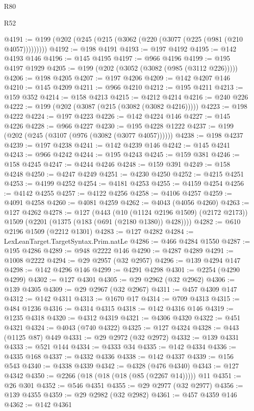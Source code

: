 \begin{lexlean}{R80}
\begin{lexlean}{R52}
\begin{coremodule}
{{{{{{{{{{{{{{{{{{{{{{{{{{{{{{{{{{{{{{{{{{{{{{{{{{{{{{{{{{{{{{{{{{{{{{{{{{{{{{{{{{{{{{{{{{{{{{{{{{{{{{{{{{{{{{{{{{{{{{{{{{{{{{{{{{{{{{{{{{{{{{{{{{{{{{{{{{{{{{{{{{{{{{{{{{{{{{{{{{{{{{{{{{{{{{{{{{{{{{@4191 := @199 (@202 (@245 (@215 (@3062 (@220 (@3077 (@225 (@981 (@210 @4057)))))))))
@4192 := @198 @4191
@4193 := @197 @4192
@4195 := @142 @4193 @146
@4196 := @145 @4195
@4197 := @966 @4196
@4199 := @195 @4197 @1929
@4205 := @199 (@202 (@3052 (@3082 (@985 (@3112 @226)))))
@4206 := @198 @4205
@4207 := @197 @4206
@4209 := @142 @4207 @146
@4210 := @145 @4209
@4211 := @966 @4210
@4212 := @195 @4211
@4213 := @159 @352
@4214 := @158 @4213
@4215 := @4212 @4214
@4216 := @240 @226
@4222 := @199 (@202 (@3087 (@215 (@3082 (@3082 @4216)))))
@4223 := @198 @4222
@4224 := @197 @4223
@4226 := @142 @4224 @146
@4227 := @145 @4226
@4228 := @966 @4227
@4230 := @195 @4228 @1222
@4237 := @199 (@202 (@245 (@3107 (@976 (@3082 (@3077 @4057))))))
@4238 := @198 @4237
@4239 := @197 @4238
@4241 := @142 @4239 @146
@4242 := @145 @4241
@4243 := @966 @4242
@4244 := @195 @4243
@4245 := @159 @381
@4246 := @158 @4245
@4247 := @4244 @4246
@4248 := @159 @391
@4249 := @158 @4248
@4250 := @4247 @4249
@4251 := @4230 @4250
@4252 := @4215 @4251
@4253 := @4199 @4252
@4254 := @4181 @4253
@4255 := @4159 @4254
@4256 := @4142 @4255
@4257 := @4122 @4256
@4258 := @4106 @4257
@4259 := @4091 @4258
@4260 := @4081 @4259
@4262 := @4043 (@4056 @4260)
@4263 := @127 @4262
@4278 := @127
    (@443
      (@10 (@1124 @2196 @1509) (@2172 @2173))
      @1509
      (@2201 (@1375 (@183 (@691 (@2180 @1380)) @428))))
@4282 := @610 @2196 @1509 (@2212 @1301)
@4283 := @127 @4282
@4284 := LexLeanTarget.TargetSyntax.Prim.natLe
@4286 := @466 @4284 @1550
@4287 := @195 @4286
@4289 := @948 @2222 @146
@4290 := @4287 @4289
@4291 := @1008 @2222
@4294 := @29 @2957 (@32 @2957)
@4296 := @139 @4294 @147
@4298 := @142 @4296 @146
@4299 := @4291 @4298
@4301 := @2254 (@4290 @4299)
@4302 := @127 @4301
@4305 := @29 @2962 (@32 @2962)
@4306 := @139 @4305
@4309 := @29 @2967 (@32 @2967)
@4311 := @457 @4309 @147
@4312 := @142 @4311
@4313 := @1670 @17
@4314 := @709 @4313
@4315 := @484 @1236
@4316 := @4314 @4315
@4318 := @142 @4316 @146
@4319 := @1235 @4318
@4320 := @4312 @4319
@4321 := @4306 @4320
@4322 := @451 @4321
@4324 := @4043 (@740 @4322)
@4325 := @127 @4324
@4328 := @443 (@1125 @87) @449
@4331 := @29 @2972 (@32 @2972)
@4332 := @139 @4331
@4333 := @521 @144
@4334 := @4333 @34
@4335 := @142 @4334
@4336 := @4335 @168
@4337 := @4332 @4336
@4338 := @142 @4337
@4339 := @156 @543
@4340 := @4338 @4339
@4342 := @4328 (@476 @4340)
@4343 := @127 @4342
@4350 := @2266 (@18 (@18 (@18 (@85 (@2267 @14))))) @11
@4351 := @26 @301
@4352 := @546 @4351
@4355 := @29 @2977 (@32 @2977)
@4356 := @139 @4355
@4359 := @29 @2982 (@32 @2982)
@4361 := @457 @4359 @146
@4362 := @142 @4361
}}}}}}}}}}}}}}}}}}}}}}}}}}}}}}}}}}}}}}}}}}}}}}}}}}}}}}}}}}}}}}}}}}}}}}}}}}}}}}}}}}}}}}}}}}}}}}}}}}}}}}}}}}}}}}}}}}}}}}}}}}}}}}}}}}}}}}}}}}}}}}}}}}}}}}}}}}}}}}}}}}}}}}}}}}}}}}}}}}}}}}}}}}}}}}}}}}}}}}
\end{coremodule}
\end{lexlean}
\end{lexlean}
